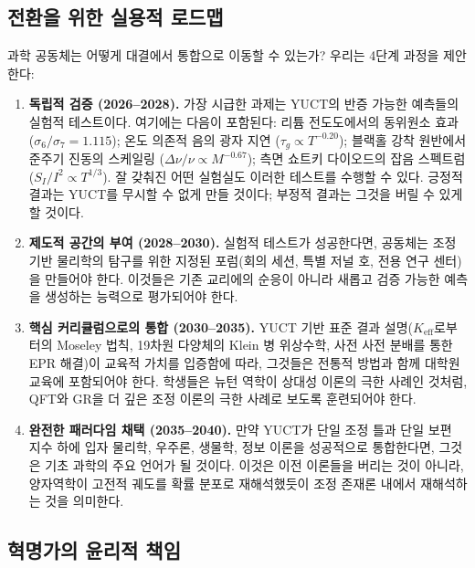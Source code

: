 \documentclass[12pt,a4paper]{article}
\begin{document}
	\subsection{전환을 위한 실용적 로드맵}
	
	과학 공동체는 어떻게 대결에서 통합으로 이동할 수 있는가? 우리는 4단계 과정을 제안한다:
	
	\begin{enumerate}
		\item \textbf{독립적 검증 (2026–2028).} 가장 시급한 과제는 YUCT의 반증 가능한 예측들의 실험적 테스트이다. 여기에는 다음이 포함된다: 리튬 전도도에서의 동위원소 효과 (\(\sigma_6/\sigma_7 = 1.115\)); 온도 의존적 음의 광자 지연 (\(\tau_g \propto T^{-0.20}\)); 블랙홀 강착 원반에서 준주기 진동의 스케일링 (\(\Delta\nu/\nu \propto M^{-0.67}\)); 측면 쇼트키 다이오드의 잡음 스펙트럼 (\(S_I/I^2 \propto T^{1/3}\)). 잘 갖춰진 어떤 실험실도 이러한 테스트를 수행할 수 있다. 긍정적 결과는 YUCT를 무시할 수 없게 만들 것이다; 부정적 결과는 그것을 버릴 수 있게 할 것이다.
		
		\item \textbf{제도적 공간의 부여 (2028–2030).} 실험적 테스트가 성공한다면, 공동체는 조정 기반 물리학의 탐구를 위한 지정된 포럼(회의 세션, 특별 저널 호, 전용 연구 센터)을 만들어야 한다. 이것들은 기존 교리에의 순응이 아니라 새롭고 검증 가능한 예측을 생성하는 능력으로 평가되어야 한다.
		
		\item \textbf{핵심 커리큘럼으로의 통합 (2030–2035).} YUCT 기반 표준 결과 설명(\(K_{\mathrm{eff}}\)로부터의 Moseley 법칙, 19차원 다양체의 Klein 병 위상수학, 사전 사전 분배를 통한 EPR 해결)이 교육적 가치를 입증함에 따라, 그것들은 전통적 방법과 함께 대학원 교육에 포함되어야 한다. 학생들은 뉴턴 역학이 상대성 이론의 극한 사례인 것처럼, QFT와 GR을 더 깊은 조정 이론의 극한 사례로 보도록 훈련되어야 한다.
		
		\item \textbf{완전한 패러다임 채택 (2035–2040).} 만약 YUCT가 단일 조정 틀과 단일 보편 지수 하에 입자 물리학, 우주론, 생물학, 정보 이론을 성공적으로 통합한다면, 그것은 기초 과학의 주요 언어가 될 것이다. 이것은 이전 이론들을 버리는 것이 아니라, 양자역학이 고전적 궤도를 확률 분포로 재해석했듯이 조정 존재론 내에서 재해석하는 것을 의미한다.
	\end{enumerate}
	
	\subsection{혁명가의 윤리적 책임}
	
\end{document}
